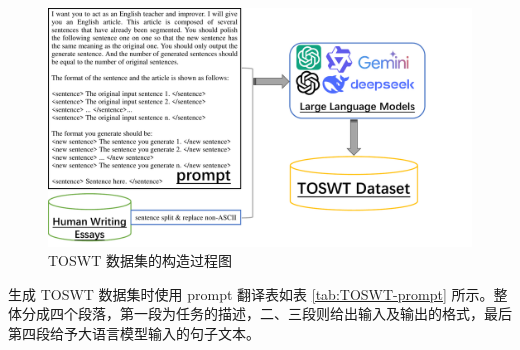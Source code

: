 \begin{figure}[htbp]
    \centering
    \includegraphics[trim=0 0 150 0, width=\textwidth]{figures/dataset-construct.pdf}
    \caption{TOSWT 数据集的构造过程图}
    \label{fig:dataset-construct}
\end{figure}

生成 TOSWT 数据集时使用 prompt 翻译表如表 \ref{tab:TOSWT-prompt} 所示。整体分成四个段落，第一段为任务的描述，二、三段则给出输入及输出的格式，最后第四段给予大语言模型输入的句子文本。

